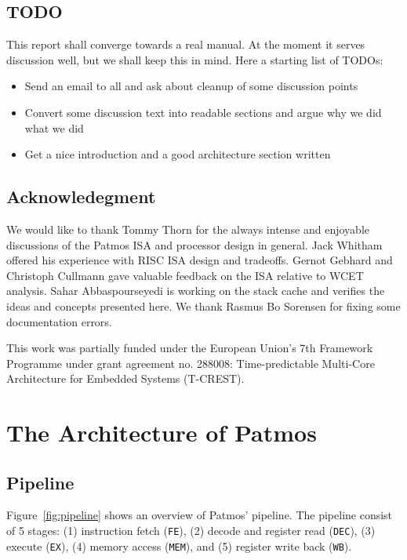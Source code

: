 \documentclass{IEEEtran}
\begin{document}
\subsection{TODO}

This report shall converge towards a real manual. At the moment it serves
discussion well, but we shall keep this in mind. Here a starting list of TODOs:

\begin{itemize}
\item Send an email to all and ask about cleanup of some discussion points
\item Convert some discussion text into readable sections and argue why we
did what we did
\item Get a nice introduction and a good architecture section written
\end{itemize}

\subsection*{Acknowledegment}

We would like to thank Tommy Thorn for the always intense and enjoyable
discussions of the Patmos ISA and processor design in general.
Jack Whitham offered his experience with RISC
ISA design and tradeoffs. 
Gernot Gebhard and Christoph Cullmann gave valuable feedback on the ISA
relative to WCET analysis.
Sahar Abbaspourseyedi is working on the stack
cache and verifies the ideas and concepts presented here. We thank
Rasmus Bo Sorensen for fixing some documentation errors.

This work was partially funded under the
European Union's 7th Framework Programme
under grant agreement no. 288008:
Time-predictable Multi-Core Architecture for Embedded
Systems (T-CREST).

\section{The Architecture of Patmos}
\label{sec:arch}

\subsection{Pipeline}

Figure~\ref{fig:pipeline} shows an overview of Patmos' pipeline. The pipeline
consist of 5 stages: (1) instruction fetch (\texttt{FE}), (2) decode and
register read (\texttt{DEC}), (3) execute (\texttt{EX}), (4) memory access (\texttt{MEM}), and (5) register write  back (\texttt{WB}).
\end{document}
